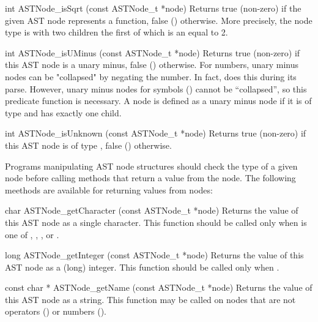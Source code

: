 \documentclass{sbmlmanual}
\begin{document}
\begin{methoddef}{int ASTNode\_isSqrt (const ASTNode\_t *node)}
  Returns true (non-zero) if the given AST node represents a 
  function, false () otherwise. 
  More precisely, the node type is  with two
  children the first of which is an  equal to 2.
\end{methoddef}


\begin{methoddef}{int ASTNode\_isUMinus (const ASTNode\_t *node)}
  Returns true (non-zero) if this AST node is a unary minus, false ()
  otherwise. 
  For numbers, unary minus nodes can be "collapsed" by negating the number.
  In fact,  does this during its parse.
  However, unary minus nodes for symbols () cannot be
  ``collapsed'', so this predicate function is necessary.
  A node is defined as a unary minus node if it is of type
   and has exactly one child.
\end{methoddef}


\begin{methoddef}{int ASTNode\_isUnknown (const ASTNode\_t *node)}
  Returns true (non-zero) if this AST node is of type ,
  false () otherwise.
\end{methoddef}



Programs manipulating AST node structures should check the type of a given
node before calling methods that return a value from the node.  The
following meethods are available for returning values from nodes:


\begin{methoddef}{char ASTNode\_getCharacter (const ASTNode\_t *node)}
  Returns the value of this AST node as a single character.  This function
  should be called only when  is one of
  , , ,
   or .
\end{methoddef}


\begin{methoddef}{long ASTNode\_getInteger (const ASTNode\_t *node)}
  Returns the value of this AST node as a (long) integer.  This function
  should be called only when .
\end{methoddef}


\begin{methoddef}{const char * ASTNode\_getName (const ASTNode\_t *node)}
  Returns the value of this AST node as a string.  This function may be
  called on nodes that are not operators () or numbers ().
\end{methoddef}
\end{document}
